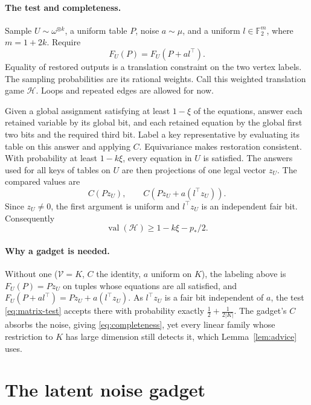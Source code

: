 \documentclass[11pt]{article}
\newcommand{\F}{\mathbb F}
\newcommand{\val}{\operatorname{val}}
\begin{document}
\paragraph{The test and completeness.}
Sample $U\sim\omega^{\otimes k}$, a uniform table $P$, noise $a\sim\mu$, and a uniform
$l\in\F_2^m$, where $m=1+2k$. Require
\begin{equation}\label{eq:matrix-test}
 F_U(P)=F_U(P+a l^\top).
\end{equation}
Equality of restored outputs is a translation constraint on the two vertex
labels. The sampling probabilities are its rational weights. Call this
weighted translation game $\mathcal H$. Loops and repeated edges are allowed
for now.

Given a global assignment satisfying at least $1-\xi$ of the equations,
answer each retained variable by its global bit, and each retained equation
by the global first two bits and the required third bit. Label a key
representative by evaluating its table on this answer and applying $C$.
Equivariance makes restoration consistent. With probability at least
$1-k\xi$, every equation in $U$ is satisfied. The answers used for all keys of tables on $U$ are then
projections of one legal vector $z_U$. The compared values are
\[
 C(Pz_U),\qquad C(Pz_U+a(l^\top z_U)).
\]
Since $z_U\ne0$, the first argument is uniform and $l^\top z_U$ is an
independent fair bit. Consequently
\begin{equation}\label{eq:completeness}
 \val(\mathcal H)\ge1-k\xi-p_*/2.
\end{equation}

\paragraph{Why a gadget is needed.}
Without one ($\mathcal V=K$, $C$ the identity, $a$ uniform on $K$), the
labeling above is $F_U(P)=Pz_U$ on tuples whose equations are all
satisfied, and $F_U(P+al^\top)=Pz_U+a(l^\top z_U)$. As $l^\top z_U$ is a
fair bit independent of $a$, the test \eqref{eq:matrix-test} accepts there
with probability exactly $\frac12+\frac1{2|K|}$. The gadget's $C$ absorbs
the noise, giving \eqref{eq:completeness}, yet every linear family whose
restriction to $K$ has large dimension still detects it, which
Lemma~\ref{lem:advice} uses.

\section{The latent noise gadget}
\label{latent:section}
\end{document}
